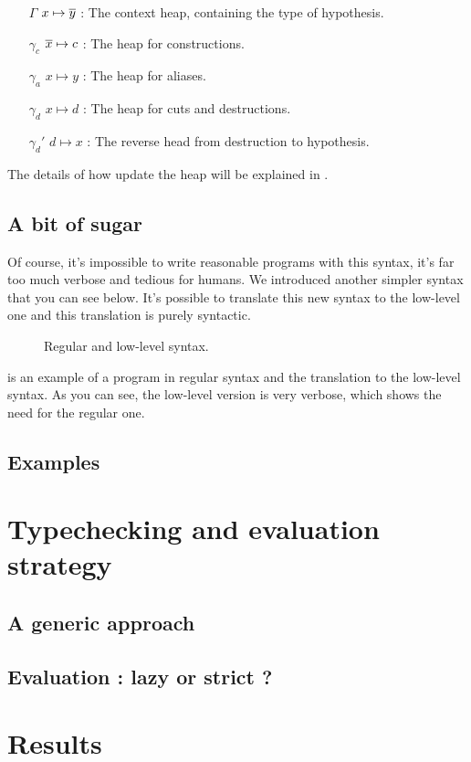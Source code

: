 \documentclass[11pt]{scrartcl}
\begin{document}
\begin{itemize}
\item[$\Gamma$] $x \mapsto \overline{y}$ : The context heap, containing the type of hypothesis.
\item[$\gamma_c$] $\overline{x} \mapsto c$  : The heap for constructions.
\item[$\gamma_a$] $x \mapsto y$ : The heap for aliases.
\item[$\gamma_d$] $x \mapsto d$ : The heap for cuts and destructions.
\item[$\gamma_d'$] $d \mapsto x$ : The reverse head from destruction to hypothesis.
\end{itemize}


The details of how update the heap will be explained in .

\subsection{A bit of sugar}
\label{sec:sugar}

Of course, it's impossible to write reasonable programs with this syntax, it's far too much verbose and tedious for humans. We introduced another simpler syntax that you can see below. It's possible to translate this new syntax to the low-level one and this translation is purely syntactic.

\begin{figure}[htbp]
  \centering
  \caption{Regular and low-level syntax.}
  \label{fig:syntaxes}
\end{figure}

 is an example of a program in regular syntax and the translation to the low-level syntax. As you can see, the low-level version is very verbose, which shows the need for the regular one.

\subsection{Examples}
\label{sec:examples}

\section{Typechecking and evaluation strategy}
\label{sec:typecheck}

\subsection{A generic approach}
\label{sec:generic-approach}



\subsection{Evaluation : lazy or strict ?}
\label{sec:evaluation}


\section{Results}
\label{sec:results}
\end{document}
